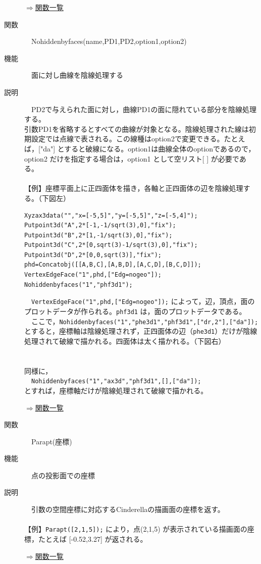 \documentclass[papersize,a4paper,12pt,uplatex]{jsarticle}
\begin{document}
\begin{description}
\begin{flushright} \hyperlink{functionlist3d}{$\Rightarrow$関数一覧}\end{flushright}

\hypertarget{nohiddenbyfaces}{}
\item[関数]　Nohiddenbyfaces(name,PD1,PD2,option1,option2)
\item[機能]　面に対し曲線を陰線処理する
\item[説明]　PD2で与えられた面に対し，曲線PD1の面に隠れている部分を陰線処理する。\\
引数PD1を省略するとすべての曲線が対象となる。陰線処理された線は初期設定では点線で表される。この線種はoption2で変更できる。たとえば，["da"] とすると破線になる。option1は曲線全体のoptionであるので，option2 だけを指定する場合は，option1 として空リスト[ ] が必要である。\\
　\\
【例】座標平面上に正四面体を描き，各軸と正四面体の辺を陰線処理する。（下図左）
\begin{verbatim}
Xyzax3data("","x=[-5,5]","y=[-5,5]","z=[-5,4]");
Putpoint3d("A",2*[-1,-1/sqrt(3),0],"fix");
Putpoint3d("B",2*[1,-1/sqrt(3),0],"fix");
Putpoint3d("C",2*[0,sqrt(3)-1/sqrt(3),0],"fix");
Putpoint3d("D",2*[0,0,sqrt(3)],"fix");
phd=Concatobj([[A,B,C],[A,B,D],[A,C,D],[B,C,D]]);
VertexEdgeFace("1",phd,["Edg=nogeo"]);
Nohiddenbyfaces("1","phf3d1"); 
\end{verbatim}

　\verb|VertexEdgeFace("1",phd,["Edg=nogeo"]);| によって，辺，頂点，面のプロットデータが作られる。\verb|phf3d1| は，面のプロットデータである。\\
　ここで，\verb|Nohiddenbyfaces("1","phe3d1","phf3d1",["dr,2"],["da"]); | とすると，座標軸は陰線処理されず，正四面体の辺（\verb|phe3d1|）だけが陰線処理されて破線で描かれる。四面体は太く描かれる。（下図右）\\
　\\
　　　　\\
同様に，\\
　\verb|Nohiddenbyfaces("1","ax3d","phf3d1",[],["da"]);|\\
とすれば，座標軸だけが陰線処理されて破線で描かれる。\\
\begin{flushright} \hyperlink{functionlist3d}{$\Rightarrow$関数一覧}\end{flushright}

\hypertarget{parapt}{}
\item[関数]　Parapt(座標)
\item[機能]　点の投影面での座標
\item[説明]　引数の空間座標に対応するCinderellaの描画面の座標を返す。\\
　\\
【例】\verb|Parapt([2,1,5]);| により，点(2,1,5) が表示されている描画面の座標，たとえば [-0.52,3.27]  が返される。\\
\begin{flushright} \hyperlink{functionlist3d}{$\Rightarrow$関数一覧}\end{flushright}


\end{description}
\end{document}
